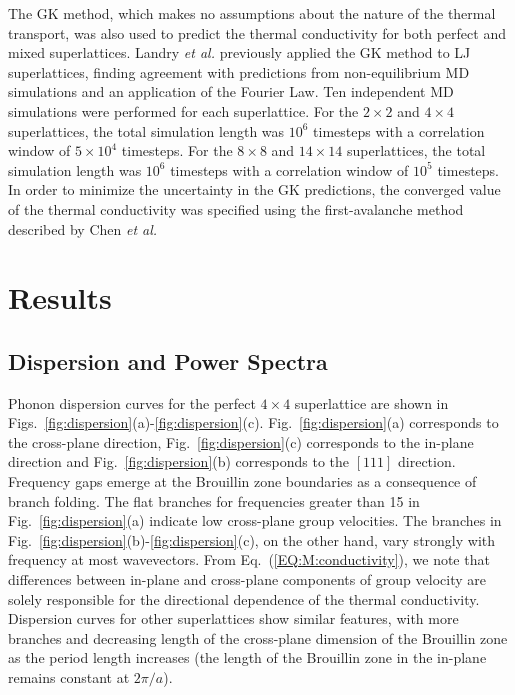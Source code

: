 \documentclass[aps,prb,preprint,preprintnumbers,amsmath,amssymb,floatfix,superscriptaddress]{revtex4}
\begin{document}
The GK method, which makes no assumptions about the nature of the thermal transport, was also used to predict the thermal conductivity for both perfect and mixed superlattices. Landry \textit{et al.} previously applied the GK method to LJ superlattices, finding agreement with predictions from non-equilibrium MD simulations and an application of the Fourier Law.\cite{PhysRevB.79.075316}
Ten independent MD simulations were performed for each superlattice. For the $2 \times 2$ and $4 \times 4$ superlattices, the total  simulation length was $10^6$ timesteps with a correlation window of $5\times 10^4$ timesteps.  For the $8 \times 8$ and $14 \times 14$ superlattices, the total  simulation length was $10^6$ timesteps with a correlation window of $10^5$ timesteps. In order to minimize the uncertainty in the GK predictions, the converged value of the thermal conductivity was specified using the first-avalanche method described by Chen \textit{et al.} \cite{Chen20102392}


\section{Results}\label{SEC:results}
\subsection{Dispersion and Power Spectra}

Phonon dispersion curves for the perfect $4\times4$ superlattice are shown in Figs.~\ref{fig:dispersion}(a)-\ref{fig:dispersion}(c). Fig.~\ref{fig:dispersion}(a) corresponds to the cross-plane direction, Fig.~\ref{fig:dispersion}(c) corresponds to the in-plane direction and Fig.~\ref{fig:dispersion}(b) corresponds to the $[1 1 1]$ direction. Frequency gaps emerge at the Brouillin zone boundaries as a consequence of branch folding.\cite{PhysRevB.38.1427,PhysRevB.60.2627} The flat branches for frequencies greater than 15 in Fig.~\ref{fig:dispersion}(a) indicate low cross-plane group velocities. The branches in Fig.~\ref{fig:dispersion}(b)-\ref{fig:dispersion}(c), on the other hand, vary strongly with frequency at most wavevectors. From Eq.~(\ref{EQ:M:conductivity}), we note that differences between in-plane and cross-plane components of group velocity are solely responsible for the directional dependence of the thermal conductivity.  Dispersion curves for other superlattices show similar features, with more branches and decreasing length of the cross-plane dimension of the Brouillin zone as the period length increases (the length of the Brouillin zone in the in-plane remains constant at $2\pi/a$).
\end{document}
